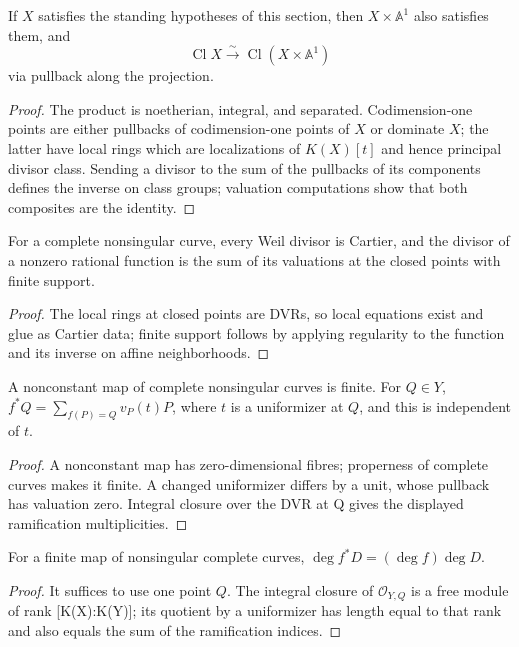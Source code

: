 \begin{proposition}
\label{prop:II-6-6}
If $X$ satisfies the standing hypotheses of this section, then $X\times\mathbb A^1$ also satisfies
them, and
\[
\operatorname{Cl}X\xrightarrow{\sim}\operatorname{Cl}(X\times\mathbb A^1)
\]
via pullback along the projection.
\end{proposition}
\begin{proof}
The product is noetherian, integral, and separated.  Codimension-one points are either pullbacks of
codimension-one points of $X$ or dominate $X$; the latter have local rings which are localizations
of $K(X)[t]$ and hence principal divisor class.  Sending a divisor to the sum of the pullbacks of
its components defines the inverse on class groups; valuation computations show that both composites
are the identity.
\end{proof}

\begin{proposition}
\label{prop:II-6-7}
For a complete nonsingular curve, every Weil divisor is Cartier, and the divisor of a nonzero
rational function is the sum of its valuations at the closed points with finite support.
\end{proposition}
\begin{proof}
The local rings at closed points are DVRs, so local equations exist and glue as Cartier data; finite
support follows by applying regularity to the function and its inverse on affine neighborhoods.
\end{proof}

\begin{proposition}
\label{prop:II-6-8}
A nonconstant map of complete nonsingular curves is finite. For $Q\in Y$,
$f^*Q=\sum_{f(P)=Q}v_P(t)P$, where $t$ is a uniformizer at $Q$, and this is independent of $t$.
\end{proposition}
\begin{proof}
A nonconstant map has zero-dimensional fibres; properness of complete curves makes it finite. A changed
uniformizer differs by a unit, whose pullback has valuation zero. Integral closure over the DVR at Q
gives the displayed ramification multiplicities.
\end{proof}

\begin{proposition}
\label{prop:II-6-9}
For a finite map of nonsingular complete curves, $\deg f^*D=(\deg f)\deg D$.
\end{proposition}
\begin{proof}
It suffices to use one point $Q$. The integral closure of $\mathcal O_{Y,Q}$ is a free module of rank
[K(X):K(Y)]; its quotient by a uniformizer has length equal to that rank and also equals the sum
of the ramification indices.
\end{proof}

